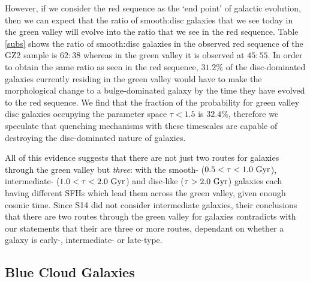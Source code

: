 \documentclass[useAMS,usenatbib]{mn2e}
\def\changed    {\color{titlecol} }
\begin{document}
{\changed However, if we consider the red sequence as the `end point' of galactic evolution, then we can expect that the ratio of smooth:disc galaxies that we see today in the green valley will evolve into the ratio that we see in the red sequence. Table \ref{subs} shows the ratio of smooth:disc galaxies in the observed red sequence of the GZ2 sample is $62:38$ whereas in the green valley it is observed at $45:55$. In order to obtain the same ratio as seen in the red sequence, $31.2\%$ of the disc-dominated galaxies currently residing in the green valley would have to make the morphological change to a bulge-dominated galaxy by the time they have evolved to the red sequence. We find that the fraction of the probability for green valley disc galaxies occupying the parameter space $\tau < 1.5$ is $32.4\%$, therefore we speculate that quenching mechanisms with these timescales are capable of destroying the disc-dominated nature of galaxies.}

All of this evidence suggests that there are not just two routes for galaxies through the green valley but \emph{three}: with the smooth- ($0.5 < \tau < 1.0 ~\rm{Gyr}$), intermediate- ($1.0 < \tau < 2.0~\rm{Gyr}$) and disc-like ($\tau > 2.0~\rm{Gyr}$) galaxies each having different SFHs which lead them across the green valley, given enough cosmic time. Since S14 did not consider intermediate galaxies, their conclusions that there are two routes through the green valley for galaxies contradicts with our statements that their are three or more routes, dependant on whether a galaxy is early-, intermediate- or late-type. 

\subsection{Blue Cloud Galaxies}\label{bc}
\end{document}
